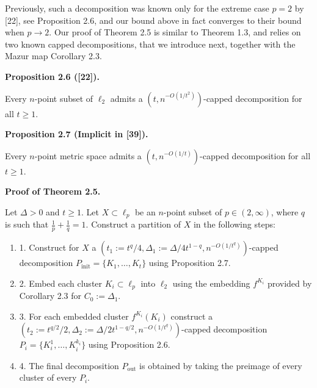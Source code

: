 \documentclass[10pt,a4paper]{amsart}
\begin{document}
\par
\par
\par
Previously, such a decomposition was known only for the extreme case $p=2$ by [22], see Proposition 2.6, and our bound above in fact converges to their bound when $p\to 2$. Our proof of Theorem 2.5 is similar to Theorem 1.3, and relies on two known capped decompositions, that we introduce next, together with the Mazur map Corollary 2.3.
\par
\par
\par\medskip\noindent\textbf{Proposition 2.6 ([22]).}\par
Every $n$-point subset of $\ell_{2}$ admits a $(t,n^{-O(1/t^{2})})$-capped decomposition for all $t\geq 1$.
\par
\par
\par
\par\medskip\noindent\textbf{Proposition 2.7 (Implicit in [39]).}\par
Every $n$-point metric space admits a $(t,n^{-O(1/t)})$-capped decomposition for all $t\geq 1$.
\par
\par
\par
\par\medskip\noindent\textbf{Proof of Theorem 2.5.}\par
Let $\Delta>0$ and $t\geq 1$. Let $X\subset\ell_{p}$ be an $n$-point subset of $p\in(2,\infty)$, where $q$ is such that $\frac{1}{p}+\frac{1}{q}=1$. Construct a partition of $X$ in the following steps:
\par
\begin{enumerate}
\item  1. 
Construct for $X$ a $(t_{1}:=t^{q}/4,\Delta_{1}:=\Delta/4t^{1-q},n^{-O(1/t^{q})})$-capped decomposition $P_{\text{init}}=\{K_{1},\ldots,K_{t}\}$ using Proposition 2.7.
\par
\par
\item  2. 
Embed each cluster $K_{i}\subset\ell_{p}$ into $\ell_{2}$ using the embedding $f^{K_{i}}$ provided by Corollary 2.3 for $C_{0}:=\Delta_{1}$.
\par
\par
\item  3. 
For each embedded cluster $f^{K_{i}}(K_{i})$ construct a $(t_{2}:=t^{q/2}/2,\Delta_{2}:=\Delta/2t^{1-q/2},n^{-O(1/t^{q})})$-capped decomposition $P_{i}=\{K_{i}^{1},\ldots,K_{i}^{k_{i}}\}$ using Proposition 2.6.
\par
\par
\item  4. 
The final decomposition $P_{\text{out}}$ is obtained by taking the preimage of every cluster of every $P_{i}$.
\par
\par
\end{enumerate}
\end{document}

